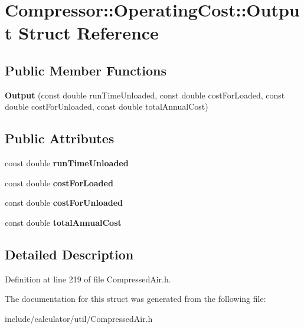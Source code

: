 \hypertarget{struct_compressor_1_1_operating_cost_1_1_output}{}\section{Compressor\+:\+:Operating\+Cost\+:\+:Output Struct Reference}
\label{struct_compressor_1_1_operating_cost_1_1_output}
\subsection*{Public Member Functions}
\begin{DoxyCompactItemize}
\item 
\mbox{\label{struct_compressor_1_1_operating_cost_1_1_output_af510363e57a9f58bdd56f9a16784697e}} 
{\bfseries Output} (const double run\+Time\+Unloaded, const double cost\+For\+Loaded, const double cost\+For\+Unloaded, const double total\+Annual\+Cost)
\end{DoxyCompactItemize}
\subsection*{Public Attributes}
\begin{DoxyCompactItemize}
\item 
\mbox{\label{struct_compressor_1_1_operating_cost_1_1_output_ae13051fb802def8fc6e18209db38b5aa}} 
const double {\bfseries run\+Time\+Unloaded}
\item 
\mbox{\label{struct_compressor_1_1_operating_cost_1_1_output_a4c65ee9ba069d432cf837f42a4702121}} 
const double {\bfseries cost\+For\+Loaded}
\item 
\mbox{\label{struct_compressor_1_1_operating_cost_1_1_output_a0e307a677ed5dbf7dba5b061cf5bfccf}} 
const double {\bfseries cost\+For\+Unloaded}
\item 
\mbox{\label{struct_compressor_1_1_operating_cost_1_1_output_a245a4b7baeb985a60d11b65f866563f0}} 
const double {\bfseries total\+Annual\+Cost}
\end{DoxyCompactItemize}


\subsection{Detailed Description}


Definition at line 219 of file Compressed\+Air.\+h.



The documentation for this struct was generated from the following file\+:\begin{DoxyCompactItemize}
\item 
include/calculator/util/Compressed\+Air.\+h\end{DoxyCompactItemize}
